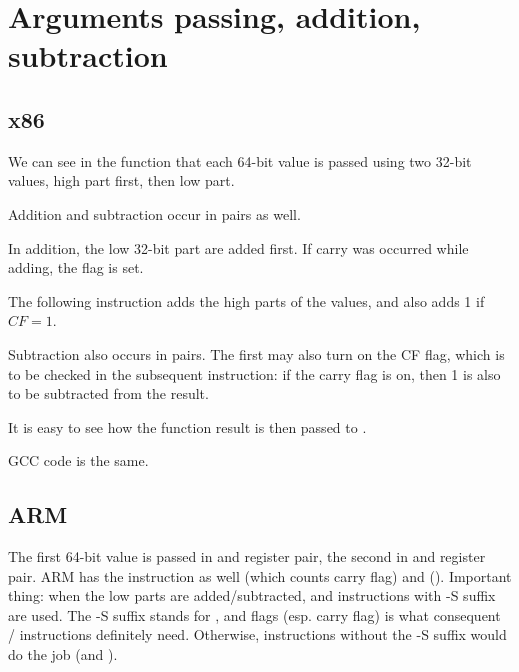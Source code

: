 ﻿\section{Arguments passing, addition, subtraction}



\subsection{x86}



We can see in the  function that each 64-bit value is passed using two 32-bit values,
high part first, then low part. 

Addition and subtraction occur in pairs as well.

In addition, the low 32-bit part are added first.
If carry was occurred while adding, the  flag is set.

The following  instruction adds the high parts of the values, and also adds 1 if $CF=1$.

Subtraction also occurs in pairs.
The first \SUB may also turn on the CF flag, which is to be checked in the subsequent  instruction:
if the carry flag is on, then 1 is also to be subtracted from the result.

It is easy to see how the  function result is then passed to \printf{}.



GCC code is the same.

\subsection{ARM}




The first 64-bit value is passed in  and  register pair, the second in  and  register pair.
ARM has the  instruction as well (which counts carry flag) and  ().
Important thing: when the low parts are added/subtracted,  and  instructions with -S suffix are used.
The -S suffix stands for , and flags (esp. carry flag) is what consequent / instructions definitely need.
Otherwise, instructions without the -S suffix would do the job (\ADD and \SUB).

